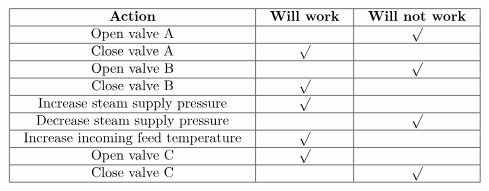 $$\vbox{\offinterlineskip
\halign{\strut
\vrule \quad\hfil # \ \hfil & 
\vrule \quad\hfil # \ \hfil & 
\vrule \quad\hfil # \ \hfil \vrule \cr
\noalign{\hrule}
%
{\bf Action} & {\bf Will work} & {\bf Will not work} \cr
%
\noalign{\hrule}
%
Open valve A &  & $\surd$ \cr
%
\noalign{\hrule}
%
Close valve A & $\surd$  & \cr
%
\noalign{\hrule}
%
Open valve B &  & $\surd$ \cr
%
\noalign{\hrule}
%
Close valve B & $\surd$  & \cr
%
\noalign{\hrule}
%
Increase steam supply pressure & $\surd$  & \cr
%
\noalign{\hrule}
%
Decrease steam supply pressure &  & $\surd$ \cr
%
\noalign{\hrule}
%
Increase incoming feed temperature & $\surd$  & \cr
%
\noalign{\hrule}
%
Open valve C & $\surd$  & \cr
%
\noalign{\hrule}
%
Close valve C &  & $\surd$ \cr
%
\noalign{\hrule}
} %
}$$ %





